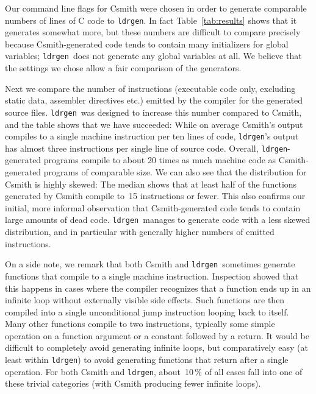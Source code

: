 \documentclass[a4paper]{easychair}
\newcommand\ldrgen{\texttt{ldrgen}}
\begin{document}


Our command line flags for Csmith were chosen in order to generate
comparable numbers of lines of C code to \ldrgen. In fact
Table~\ref{tab:results} shows that it generates somewhat more, but these
numbers are difficult to compare precisely because Csmith-generated code
tends to contain many initializers for global variables; \ldrgen\ does not
generate any global variables at all. We believe that the settings we chose
allow a fair comparison of the generators.

Next we compare the number of instructions (executable code only, excluding
static data, assembler directives etc.) emitted by the compiler for the
generated source files. \ldrgen\ was designed to increase this number
compared to Csmith, and the table shows that we have succeeded: While on
average Csmith's output compiles to a single machine instruction per ten
lines of code, \ldrgen's output has almost three instructions per single
line of source code. Overall, \ldrgen-generated programs compile to about 20
times as much machine code as Csmith-generated programs of comparable size.
We can also see that the distribution for Csmith is highly skewed: The
median shows that at least half of the functions generated by Csmith compile
to~15 instructions or fewer. This also confirms our initial, more informal
observation that Csmith-generated code tends to contain large amounts of
dead code. \ldrgen\ manages to generate code with a less skewed
distribution, and in particular with generally higher numbers of emitted
instructions.

On a side note, we remark that both Csmith and \ldrgen\ sometimes generate
functions that compile to a single machine instruction. Inspection showed
that this happens in cases where the compiler recognizes that a function
ends up in an infinite loop without externally visible side effects. Such
functions are then compiled into a single unconditional jump instruction
looping back to itself. Many other functions compile to two instructions,
typically some simple operation on a function argument or a constant
followed by a return. It would be difficult to completely avoid generating
infinite loops, but comparatively easy (at least within \ldrgen) to avoid
generating functions that return after a single operation. For both Csmith
and \ldrgen, about~10\,\% of all cases fall into one of these trivial
categories (with Csmith producing fewer infinite loops).
\end{document}
